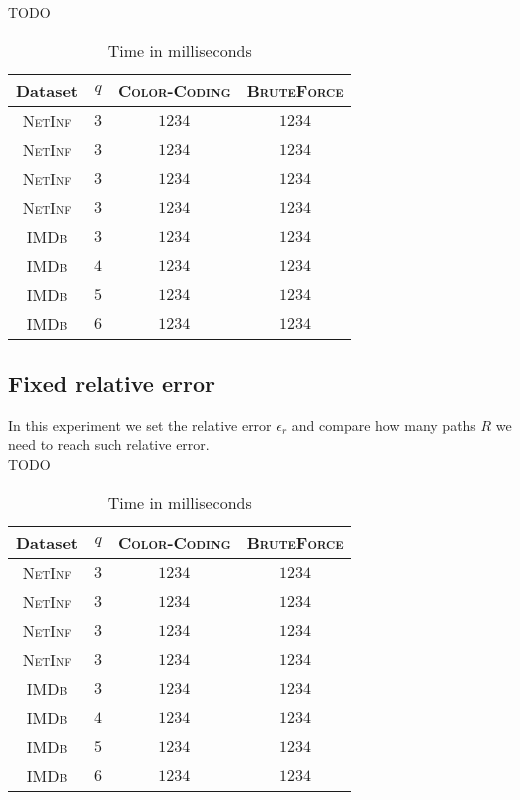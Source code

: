 	TODO
	\begin{table}[h]
		\centering
		\label{my-label}
		\begin{tabular}{|c|c|c|c|}
			\hline
			Dataset 		& $q$ & \textsc{Color-Coding} 	& \textsc{BruteForce} \\ \hline
			\textsc{NetInf}	& $3$ & $1234$					& $1234$ \\ \hline
			\textsc{NetInf}	& $3$ & $1234$					& $1234$ \\ \hline
			\textsc{NetInf}	& $3$ & $1234$					& $1234$ \\ \hline
			\textsc{NetInf}	& $3$ & $1234$					& $1234$ \\ \hline
			\textsc{IMDb}	& $3$ & $1234$					& $1234$ \\ \hline
			\textsc{IMDb}	& $4$ & $1234$					& $1234$ \\ \hline
			\textsc{IMDb}	& $5$ & $1234$					& $1234$ \\ \hline
			\textsc{IMDb}	& $6$ & $1234$					& $1234$ \\ \hline
		\end{tabular}
		\caption{Time in milliseconds}
	\end{table}
		
	\subsection*{Fixed relative error}
	
	In this experiment we set the relative error $\epsilon_{r}$ and compare how many paths $R$ we need to reach such relative error.\\
	
	TODO
	\begin{table}[h]
		\centering
		\label{my-label}
		\begin{tabular}{|c|c|c|c|}
			\hline
			Dataset 		& $q$ & \textsc{Color-Coding} 	& \textsc{BruteForce} \\ \hline
			\textsc{NetInf}	& $3$ & $1234$					& $1234$ \\ \hline
			\textsc{NetInf}	& $3$ & $1234$					& $1234$ \\ \hline
			\textsc{NetInf}	& $3$ & $1234$					& $1234$ \\ \hline
			\textsc{NetInf}	& $3$ & $1234$					& $1234$ \\ \hline
			\textsc{IMDb}	& $3$ & $1234$					& $1234$ \\ \hline
			\textsc{IMDb}	& $4$ & $1234$					& $1234$ \\ \hline
			\textsc{IMDb}	& $5$ & $1234$					& $1234$ \\ \hline
			\textsc{IMDb}	& $6$ & $1234$					& $1234$ \\ \hline
		\end{tabular}
		\caption{Time in milliseconds}
	\end{table}
	
